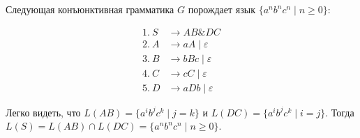 \begin{example}
	Следующая конъюнктивная грамматика $G$ порождает язык $\{a^nb^nc^n\mid n \geq 0\}$:
	
    \begin{align*}
    1.\ S   &\to A B \& D C \\
    2.\ A  &\to a A \mid \varepsilon \\ 
	3.\ B &\to b B c \mid \varepsilon \\
	4.\ C   &\to c C \mid \varepsilon \\ 
	5.\ D   &\to aDb \mid \varepsilon
    \end{align*}
	
	Легко видеть, что $L(AB) = \{a^ib^jc^k\mid j = k\}$ и $L(DC) = \{a^ib^jc^k\mid i = j\}$. Тогда $L(S) = L(AB) \cap L(DC) = \{a^nb^nc^n\mid n \geq 0\}$. 
	

\end{example}
